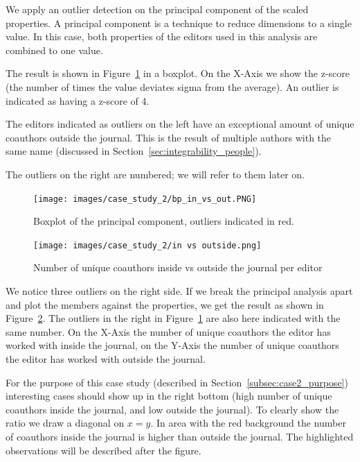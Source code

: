 \documentclass{ou-report}
\begin{document}
We apply an outlier detection on the principal component of the scaled properties. 
A principal component is a technique to reduce dimensions to a single value.
In this case, both properties of the editors used in this analysis are combined
to one value.

The result is shown in 
Figure~\ref{fig:cs2_bp_in_out} in a boxplot.
On the X-Axis we show the z-score (the number of times the value deviates sigma 
from the average). An outlier is indicated as having a z-score of 4.

The editors indicated as outliers on the left have an exceptional amount
of unique coauthors outside the journal. This is the result of multiple authors
with the same name (discussed in Section~\ref{sec:integrability_people}).

The outliers on the right are numbered; we will refer to them later on.

\begin{figure}[ht]
    \centering
    \texttt{[image: images/case\_study\_2/bp\_in\_vs\_out.PNG]}
    \caption{Boxplot of the principal component, outliers indicated in red.}
    \label{fig:cs2_bp_in_out}
\end{figure}

\begin{figure}
    \centering
    \texttt{[image: images/case\_study\_2/in vs outside.png]}
    \caption{Number of unique coauthors inside vs outside the journal per editor}
    \label{fig:editors_in_out_journal}
\end{figure}

We notice three outliers on the right side. If we break the principal analysis 
apart and plot the members against the properties, we get the result as shown in 
Figure~\ref{fig:editors_in_out_journal}. The outliers
in the right in Figure~\ref{fig:cs2_bp_in_out} are also here indicated with the 
same number. On the X-Axis
the number of unique coauthors the editor has worked with inside the journal, on 
the Y-Axis the number of unique coauthors the editor has worked with outside the 
journal. 

For the purpose of this case study (described in 
Section~\ref{subsec:case2_purpose}) interesting cases should show up in the right 
bottom (high number of unique coauthors inside the journal, and low outside the 
journal).
To clearly show the ratio we draw a diagonal on \(x = y\). In area with the red 
background the number of coauthors inside the journal is higher than outside the 
journal.
The highlighted observations will be described after the figure.
\end{document}
